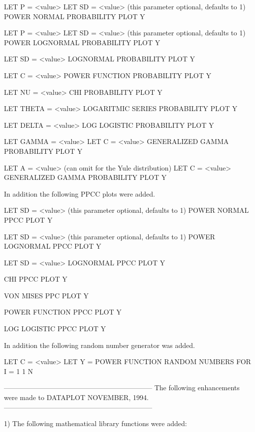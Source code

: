 {      LET P = <value>
      LET SD = <value>  (this parameter optional, defaults to 1)
      POWER NORMAL PROBABILITY PLOT Y

      LET P = <value>
      LET SD = <value>   (this parameter optional, defaults to 1)
      POWER LOGNORMAL PROBABILITY PLOT Y

      LET SD = <value>
      LOGNORMAL PROBABILITY PLOT Y

      LET C = <value>
      POWER FUNCTION PROBABILITY PLOT Y

      LET NU = <value>
      CHI PROBABILITY PLOT Y

      LET THETA = <value>
      LOGARITMIC SERIES PROBABILITY PLOT Y

      LET DELTA = <value>
      LOG LOGISTIC PROBABILITY PLOT Y

      LET GAMMA = <value>
      LET C = <value>
      GENERALIZED GAMMA PROBABILITY PLOT Y

      LET A = <value>  (can omit for the Yule distribution)
      LET C = <value>
      GENERALIZED GAMMA PROBABILITY PLOT Y

    In addition the following PPCC plots were added.

      LET SD = <value>  (this parameter optional, defaults to 1)
      POWER NORMAL PPCC PLOT Y

      LET SD = <value>   (this parameter optional, defaults to 1)
      POWER LOGNORMAL PPCC PLOT Y

      LET SD = <value>
      LOGNORMAL PPCC PLOT Y

      CHI PPCC PLOT Y

      VON MISES PPC PLOT Y

      POWER FUNCTION PPCC PLOT Y

      LOG LOGISTIC PPCC PLOT Y

    In addition the following random number generator was added.

      LET C = <value>
      LET Y = POWER FUNCTION RANDOM NUMBERS FOR I = 1 1 N

-----------------------------------------------------------------
The following enhancements were made to DATAPLOT NOVEMBER, 1994.
-----------------------------------------------------------------

 1) The following mathematical library functions were added:

}
